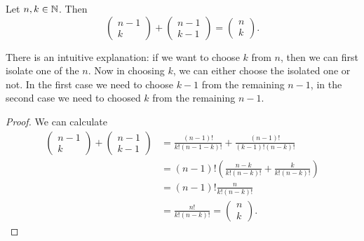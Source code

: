 \begin{proposition} \label{PascalsFormula}
Let $n,k\in \mathbb{N}$. Then
\[ \begin{pmatrix}
n-1 \\ k
\end{pmatrix} + \begin{pmatrix}
n-1 \\ k-1
\end{pmatrix} = \begin{pmatrix}
n \\ k
\end{pmatrix}. \]
\end{proposition}
There is an intuitive explanation: if we want to choose $k$ from $n$, then we can first isolate one of the $n$. Now in choosing $k$, we can either choose the isolated one or not. In the first case we need to choose $k-1$ from the remaining $n-1$, in the second case we need to choosed $k$ from the remaining $n-1$.
\begin{proof}
We can calculate
\begin{align*}
\begin{pmatrix}
n-1 \\ k
\end{pmatrix} + \begin{pmatrix}
n-1 \\ k-1
\end{pmatrix} &= \frac{(n-1)!}{k!(n-1-k)!} + \frac{(n-1)!}{(k-1)!(n-k)!} \\
&= (n-1)!\left(\frac{n-k}{k!(n-k)!} + \frac{k}{k!(n-k)!}\right) \\
&= (n-1)! \frac{n}{k!(n-k)!} \\
&= \frac{n!}{k!(n-k)!} = \begin{pmatrix}
n \\ k
\end{pmatrix}.
\end{align*}
\end{proof}

